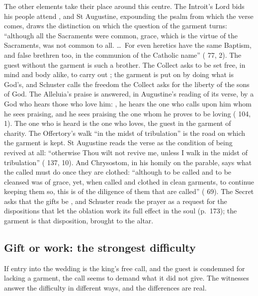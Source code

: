 The other elements take their place around this centre. The Introit's Lord
bids his people attend , and St Augustine, expounding the
psalm from which the verse comes, draws the distinction on which the question
of the garment turns: ``although all the Sacraments were common, grace, which is the
virtue of the Sacraments, was not common to all. \dots\ For even heretics have
the same Baptism, and false brethren too, in the communion of the Catholic
name'' ( 77, 2). The guest without the garment is such a
brother. The Collect asks to be set free, in mind and body alike, to carry out
; the garment is put on by doing what is God's, and
Schuster calls the freedom the Collect asks for the liberty of the sons of
God. The Alleluia's praise is answered, in Augustine's reading of its verse,
by a God who hears those who love him: , he hears the one who
calls upon him whom he sees praising, and he sees praising the one whom he
proves to be loving ( 104, 1). The one who is heard is the
one who loves, the guest in the garment of charity. The Offertory's walk
``in the midst of tribulation'' is the road on which the garment is kept. St
Augustine reads the verse as the condition of being revived at all:
``otherwise Thou wilt not revive me, unless I walk in the midst of
tribulation'' ( 137, 10). And Chrysostom, in his homily on
the parable, says what the called must do once they are clothed: ``although to be called and to
be cleansed was of grace, yet, when called and clothed in clean garments, to
continue keeping them so, this is of the diligence of them that are called''
( 69). The Secret asks that the gifts be
, and Schuster reads the prayer as a request for the
dispositions that let the oblation work its full effect in the soul
(p.~173); the garment is that disposition, brought to the altar.

\subsection{Gift or work: the strongest difficulty}

If entry into the wedding is the king's free call, and the guest is condemned
for lacking a garment, the call seems to demand what it did not give. The
witnesses answer the difficulty in different ways, and the differences are
real.

